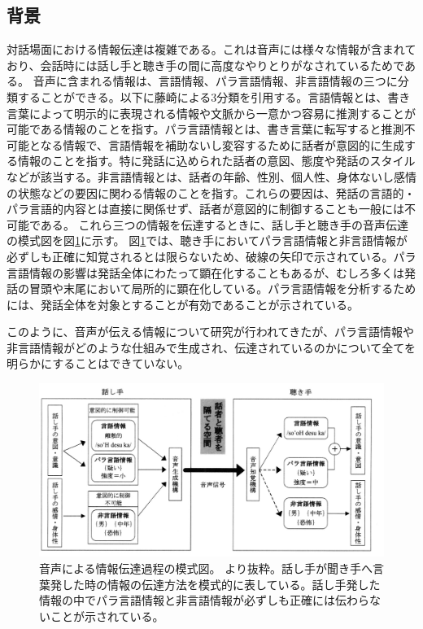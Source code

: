 
\subsection{背景}
対話場面における情報伝達は複雑である。これは音声には様々な情報が含まれており、会話時には話し手と聴き手の間に高度なやりとりがなされているためである。
音声に含まれる情報は、言語情報、パラ言語情報、非言語情報の三つに分類することができる。以下に藤崎による3分類を引用する。言語情報とは、書き言葉によって明示的に表現される情報や文脈から一意かつ容易に推測することが可能である情報のことを指す。パラ言語情報とは、書き言葉に転写すると推測不可能となる情報で、言語情報を補助ないし変容するために話者が意図的に生成する情報のことを指す。特に発話に込められた話者の意図、態度や発話のスタイルなどが該当する。非言語情報とは、話者の年齢、性別、個人性、身体ないし感情の状態などの要因に関わる情報のことを指す。これらの要因は、発話の言語的・パラ言語的内容とは直接に関係せず、話者が意図的に制御することも一般には不可能である\cite{fujisaki}。
これら三つの情報を伝達するときに、話し手と聴き手の音声伝達の模式図を図\ref{maekawa_onsei:fig}に示す。
図\ref{maekawa_onsei:fig}では、聴き手においてパラ言語情報と非言語情報が必ずしも正確に知覚されるとは限らないため、破線の矢印で示されている。パラ言語情報の影響は発話全体にわたって顕在化することもあるが、むしろ多くは発話の冒頭や末尾において局所的に顕在化している\cite{maekawa_kitagawa}。パラ言語情報を分析するためには、発話全体を対象とすることが有効であることが示されている。

このように、音声が伝える情報について研究が行われてきたが、パラ言語情報や非言語情報がどのような仕組みで生成され、伝達されているのかについて全てを明らかにすることはできていない。

\begin{figure}[hbtp]
 \centering
   \includegraphics[width=12.0cm]{figures/maekawa_onsei.png}
 \caption[音声による情報伝達過程の模式図]{音声による情報伝達過程の模式図。 \cite{maekawa_onsei}より抜粋。話し手が聞き手へ言葉発した時の情報の伝達方法を模式的に表している。話し手発した情報の中でパラ言語情報と非言語情報が必ずしも正確には伝わらないことが示されている。 }
 \label{maekawa_onsei:fig}
\end{figure}

